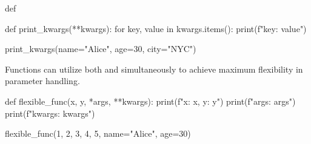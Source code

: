 \documentclass[10pt]{article}
\begin{document}
\begin{core}[label=core:def]{def}
\begin{pyconsole}
      def print_kwargs(**kwargs):
          for key, value in kwargs.items():
              print(f"{key}: {value}")
      
      print_kwargs(name="Alice", age=30, city="NYC")

    \end{pyconsole}
    
    Functions can utilize both  and  simultaneously to achieve maximum flexibility in parameter handling.

    \begin{pyconsole}

      def flexible_func(x, y, *args, **kwargs):
          print(f"x: {x}, y: {y}")
          print(f"args: {args}")
          print(f"kwargs: {kwargs}")
      
      flexible_func(1, 2, 3, 4, 5, name="Alice", age=30)

    \end{pyconsole}

  \end{core}
\end{document}
